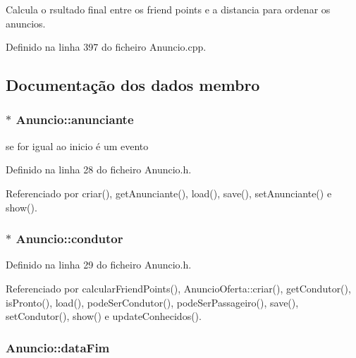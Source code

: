 Calcula o rsultado final entre os friend points e a distancia para ordenar os anuncios. 



Definido na linha 397 do ficheiro Anuncio.\+cpp.



\subsection{Documentação dos dados membro}
\hypertarget{class_anuncio_a58250bfc8ab82d4308839b1e26213a0f}{
\subsubsection[{anunciante}]{$\ast$ Anuncio\+::anunciante\hspace{0.3cm}{\ttfamily [protected]}}}\label{class_anuncio_a58250bfc8ab82d4308839b1e26213a0f}


se for igual ao inicio é um evento 



Definido na linha 28 do ficheiro Anuncio.\+h.



Referenciado por criar(), get\+Anunciante(), load(), save(), set\+Anunciante() e show().

\hypertarget{class_anuncio_a8771818ef0855c6b70e2aca6c89e3177}{
\subsubsection[{condutor}]{$\ast$ Anuncio\+::condutor\hspace{0.3cm}{\ttfamily [protected]}}}\label{class_anuncio_a8771818ef0855c6b70e2aca6c89e3177}


Definido na linha 29 do ficheiro Anuncio.\+h.



Referenciado por calcular\+Friend\+Points(), Anuncio\+Oferta\+::criar(), get\+Condutor(), is\+Pronto(), load(), pode\+Ser\+Condutor(), pode\+Ser\+Passageiro(), save(), set\+Condutor(), show() e update\+Conhecidos().

\hypertarget{class_anuncio_ac3b9182cc541cb68215f8aa09fb0e11a}{
\subsubsection[{data\+Fim}]{ Anuncio\+::data\+Fim\hspace{0.3cm}{\ttfamily [protected]}}}\label{class_anuncio_ac3b9182cc541cb68215f8aa09fb0e11a}


